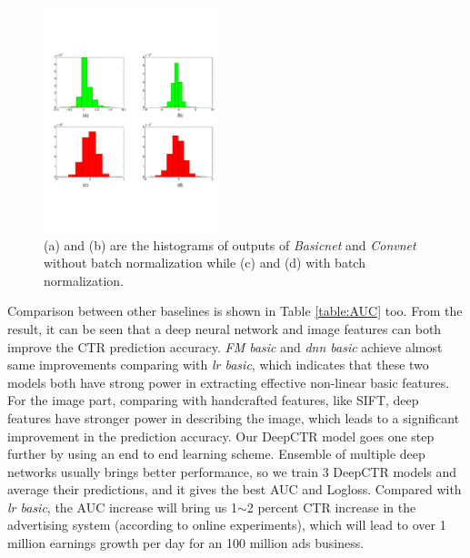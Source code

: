 \documentclass{sig-alternate}
\begin{document}
\begin{figure}
	\centering
	\includegraphics[width=0.45\textwidth]{bn_hist_fix_3}
	\caption{(a) and (b) are the histograms of outputs of \emph{Basicnet} and \emph{Convnet} without batch normalization while (c) and (d) with batch normalization. }
	\label{fig:bn_comb}
\end{figure}

Comparison between other baselines is shown in Table \ref{table:AUC} too. From the result, it can be seen that a deep neural network and image features can both improve the CTR prediction accuracy.  \emph{FM basic} and \emph{dnn basic} achieve almost same improvements comparing with \emph{lr basic}, which  indicates that these two models both have strong  power in extracting effective non-linear basic features.   For the image part, comparing with handcrafted features, like SIFT, deep features have stronger power in describing the image, which leads to a significant improvement in the prediction accuracy. Our DeepCTR model goes one step further by using an end to end learning scheme. Ensemble of multiple deep networks usually brings better performance, so we train 3 DeepCTR models and average their predictions, and it gives the best AUC and Logloss. Compared with \emph{lr basic}, the AUC increase will bring us 1$\sim$2 percent CTR increase in the advertising system (according to online experiments), which will lead to over 1 million earnings growth per day for an 100 million ads business.  
\end{document}
